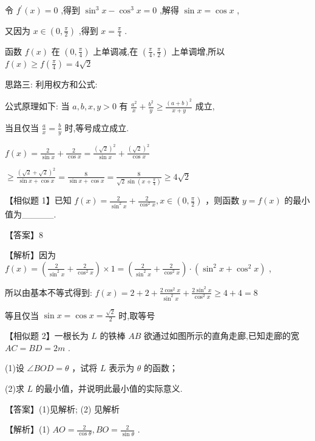 \documentclass[10pt]{article}
\begin{document}
令 \({f}^{\prime }\left( x\right)  = 0\) ,得到 \({\sin }^{3}x - {\cos }^{3}x = 0\) ,解得 \(\sin x = \cos x\) ,

又因为 \(x \in  \left( {0,\frac{\pi }{2}}\right)\) ,得到 \(x = \frac{\pi }{4}\) .

函数 \(f\left( x\right)\) 在 \(\left( {0,\frac{\pi }{4}}\right)\) 上单调减,在 \(\left( {\frac{\pi }{4},\frac{\pi }{2}}\right)\) 上单调增,所以 \(f\left( x\right)  \geq  f\left( \frac{\pi }{4}\right)  = 4\sqrt{2}\)

思路三: 利用权方和公式:

公式原理如下: 当 \(a,b,x,y > 0\) 有 \(\frac{{a}^{2}}{x} + \frac{{b}^{2}}{y} \geq  \frac{{\left( a + b\right) }^{2}}{x + y}\) 成立,

当且仅当 \(\frac{a}{x} = \frac{b}{y}\) 时,等号成立成立.

\(f\left( x\right)  = \frac{2}{\sin x} + \frac{2}{\cos x} = \frac{{\left( \sqrt{2}\right) }^{2}}{\sin x} + \frac{{\left( \sqrt{2}\right) }^{2}}{\cos x}\)

\(\geq  \frac{{\left( \sqrt{2} + \sqrt{2}\right) }^{2}}{\sin x + \cos x} = \frac{8}{\sin x + \cos x} = \frac{8}{\sqrt{2}\sin \left( {x + \frac{\pi }{4}}\right) } \geq  4\sqrt{2}\)

【相似题 1】已知 \(f\left( x\right)  = \frac{2}{{\sin }^{2}x} + \frac{2}{{\cos }^{2}x},x \in  \left( {0,\frac{\pi }{2}}\right)\) ，则函数 \(y = f\left( x\right)\) 的最小值为\_\_\_\_\_.

【答案】8

【解析】因为 \(f\left( x\right)  = \left( {\frac{2}{{\sin }^{2}x} + \frac{2}{{\cos }^{2}x}}\right)  \times  1 = \left( {\frac{2}{{\sin }^{2}x} + \frac{2}{{\cos }^{2}x}}\right)  \cdot  \left( {{\sin }^{2}x + {\cos }^{2}x}\right)\) ,

所以由基本不等式得到: \(f\left( x\right)  = 2 + 2 + \frac{2{\cos }^{2}x}{{\sin }^{2}x} + \frac{2{\sin }^{2}x}{{\cos }^{2}x} \geq  4 + 4 = 8\)

等且仅当 \(\sin x = \cos x = \frac{\sqrt{2}}{2}\) 时,取等号

【相似题 2】一根长为 \(L\) 的铁棒 \({AB}\) 欲通过如图所示的直角走廊,已知走廊的宽 \({AC} = {BD} = {2m}\) .

(1)设 \(\angle {BOD} = \theta\) ，试将 \(L\) 表示为 \(\theta\) 的函数；

(2)求 \(L\) 的最小值，并说明此最小值的实际意义.

【答案】(1)见解析; (2) 见解析

【解析】(1) \({AO} = \frac{2}{\cos \theta },{BO} = \frac{2}{\sin \theta }\) .
\end{document}
